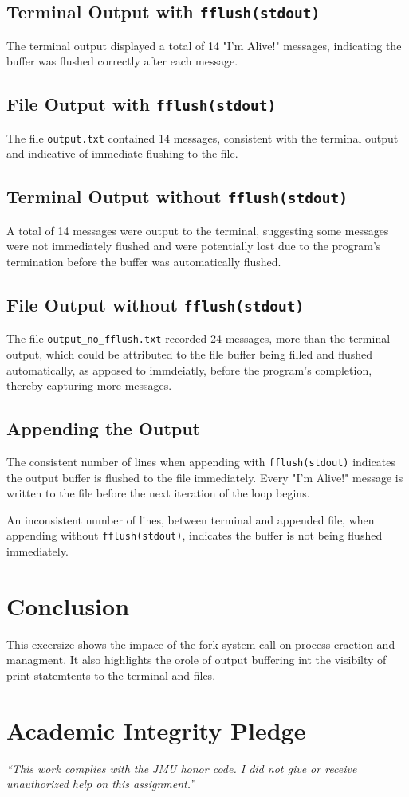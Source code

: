 \documentclass[12pt]{article}
\begin{document}
\subsection{Terminal Output with \texttt{fflush(stdout)}}
The terminal output displayed a total of 14 "I'm Alive!" messages, indicating the buffer was flushed correctly after each message.

\subsection{File Output with \texttt{fflush(stdout)}}
The file \texttt{output.txt} contained 14 messages, consistent with the terminal output and indicative of immediate flushing to the file.

\subsection{Terminal Output without \texttt{fflush(stdout)}}
A total of 14 messages were output to the terminal, suggesting some messages were not immediately flushed and were potentially lost due to the program's termination before the buffer was automatically flushed.

\subsection{File Output without \texttt{fflush(stdout)}}
The file \texttt{output\_no\_fflush.txt} recorded 24 messages, more than the terminal output, which could be attributed to the file buffer being filled and flushed automatically, as apposed to immdeiatly, before the program's completion, thereby capturing more messages.

\subsection{Appending the Output}
The consistent number of lines when appending with \texttt{fflush(stdout)} indicates the output buffer is flushed to the file immediately. Every "I'm Alive!" message is written to the file before the next iteration of the loop begins. 

An inconsistent number of lines, between terminal and appended file, when appending without \texttt{fflush(stdout)}, indicates the buffer is not being flushed immediately. 

\section{Conclusion}
This excersize shows the impace of the fork system call on process craetion and managment. It also highlights the orole of output buffering int the visibilty of print statemtents to the terminal and files. 

\vfill
  \section*{Academic Integrity Pledge}
    {\color{red}\textit{“This work complies with the JMU honor code. I did not give or receive unauthorized help on this assignment.”}}
\end{document}

